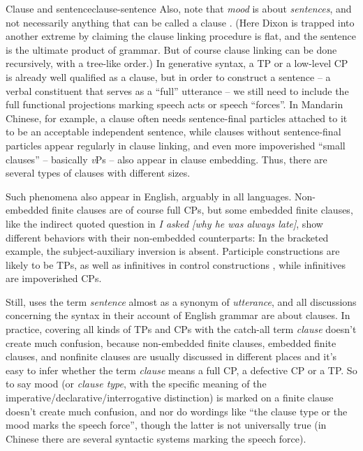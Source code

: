 \documentclass[UTF8, a4paper, oneside, scheme=plain]{ctexrep}
\newcommand*{\citepage}[1]{pp.~{#1}}
\newcommand*{\term}[1]{\emph{#1}}
\newcommand{\corpus}[1]{\emph{#1}}
\newcommand{\vP}{\textit{v}P}
\begin{document}
\begin{theorybox}{Clause and sentence}{clause-sentence}
    Also, note that \emph{mood} is about \emph{sentences}, 
    and not necessarily anything that can be called a clause \citet[96]{dixon2009basic1}.
    (Here Dixon is trapped into another extreme by claiming 
    the clause linking procedure is flat,
    and the sentence is the ultimate product of grammar.
    But of course clause linking can be done recursively,
    with a tree-like order.)
    In generative syntax, 
    a TP or a low-level CP is already well qualified as a clause,
    but in order to construct a sentence -- a verbal constituent 
    that serves as a ``full'' utterance --
    we still need to include the full functional projections marking speech acts or speech ``forces''.
    In Mandarin Chinese, for example,
    a clause often needs sentence-final particles attached to it to be an acceptable independent sentence,
    while clauses without sentence-final particles appear regularly in 
    clause linking,
    and even more impoverished ``small clauses'' -- basically \vP{}s -- also appear in clause embedding.
    Thus, there are several types of clauses with different sizes.

    Such phenomena also appear in English, arguably in all languages.
    Non-embedded finite clauses are of course full CPs,
    but some embedded finite clauses,
    like the indirect quoted question in \corpus{I asked [why he was always late]},
    show different behaviors with their non-embedded counterparts:
    In the bracketed example, the subject-auxiliary inversion is absent.
    Participle constructions are likely to be TPs, as well as infinitives in control constructions
    \citep{pires2006minimalist},
    while infinitives are impoverished CPs.

    Still, \citet[\citepage{45}, \citepage{853}]{cgel} uses the term \term{sentence} 
    almost as a synonym of \term{utterance},
    and all discussions concerning the syntax in their account of English grammar are about clauses.
    In practice, covering all kinds of TPs and CPs with the catch-all term \term{clause}
    doesn't create much confusion,
    because non-embedded finite clauses, 
    embedded finite clauses, and nonfinite clauses are usually discussed in different places 
    and it's easy to infer whether the term \term{clause} 
    means a full CP, a defective CP or a TP. 
    So to say mood (or \term{clause type}, 
    with the specific meaning of the imperative/declarative/interrogative distinction)
    is marked on a finite clause doesn't create much confusion, 
    and nor do wordings like ``the clause type or the mood marks the speech force'',
    though the latter is not universally true
    (in Chinese there are several syntactic systems marking the speech force).
\end{theorybox}
\end{document}
